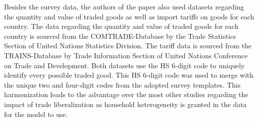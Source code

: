 Besides the survey data, the authors of the paper also used datasets regarding the quantity and value of traded goods as well 
as import tariffs on goods for each country. The data regarding the quantity and value of traded goods for each country is 
sourced from the COMTRADE-Database by the Trade Statistics Section of United Nations Statistics Division.
The tariff data is sourced from the TRAINS-Database by Trade Information Section of United Nations Conference on Trade and
Development. Both datasets use the HS 6-digit code to uniquely identify every possible traded good. This HS 6-digit code
was used to merge with the unique two and four-digit codes from the adopted survey templates. This harmonization leads to the 
advantage over the most other studies regarding the impact of trade liberalization as household heterogeneity is granted in 
the data for the model to use.
